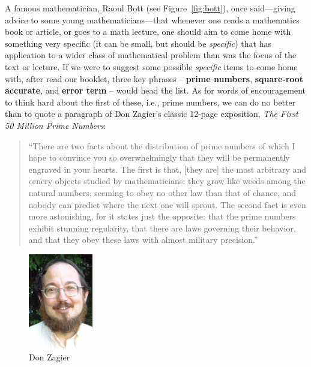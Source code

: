 \documentclass[11pt]{article}
\theoremstyle{plain}
\theoremstyle{definition}
\numberwithin{equation}{section}
\numberwithin{figure}{section}
\numberwithin{table}{section}
\begin{document}
A famous mathematician, Raoul Bott (see Figure~\ref{fig:bott}), once
said---giving advice to some young mathematicians---that whenever one
reads a mathematics book or article, or goes to a math lecture, one
should aim to come home with something very specific (it can be small,
but should be {\em specific}) that has application to a wider class of
mathematical problem than was the focus of the text or lecture.  If we
were to suggest some possible {\em specific} items to come home with,
after read our booklet, three key phrases -- {\bf prime numbers}, {\bf
  square-root accurate}, and {\bf error term} -- would head the
list. As for words of encouragement to think hard about the first of
these, i.e., prime numbers, we can do no better than to quote a
paragraph of Don Zagier's classic 12-page exposition, {\em The First
  50 Million Prime Numbers}:
    
\begin{quote}                      
  ``There are two facts about the distribution of prime numbers of
  which I hope to convince you so overwhelmingly that they will be
  permanently engraved in your hearts. The first is that, [they are]
  the most arbitrary and ornery objects studied by mathematicians:
  they grow like weeds among the natural numbers, seeming to obey no
  other law than that of chance, and nobody can predict where the next
  one will sprout. The second fact is even more astonishing, for it
  states just the opposite: that the prime numbers exhibit stunning
  regularity, that there are laws governing their behavior, and that
  they obey these laws with almost military precision.''
\end{quote}
                    
\begin{figure}[H]\label{fig:zagier}
\begin{center}
\includegraphics[width=0.25\textwidth]{illustrations/zagier}
\caption{Don Zagier}
\end{center}
\end{figure}
\end{document}
